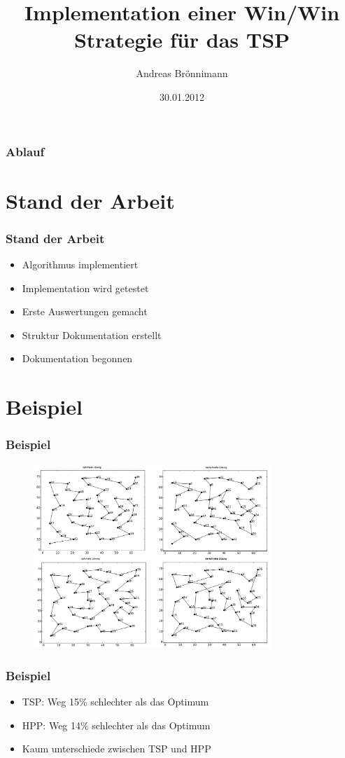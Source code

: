 \documentclass[12pt]{beamer}
\title[Design-Review Semesterarbeit]{Implementation einer Win/Win Strategie für das TSP}
\author{Andreas Brönnimann}
\institute{ZHAW - Zürcher Hochschule für Angewandte Wissenschaften}
\date{30.01.2012}
\begin{document}
    \begin{frame}
        \titlepage
    \end{frame}

    \begin{frame}
        \frametitle{Ablauf}
        \tableofcontents
    \end{frame}

    \section{Stand der Arbeit}
    \begin{frame}
        \frametitle{Stand der Arbeit}
	    \begin{itemize}
                \item Algorithmus implementiert
                \item Implementation wird getestet
                \item Erste Auswertungen gemacht
                \item Struktur Dokumentation erstellt
                \item Dokumentation begonnen
            \end{itemize}
    \end{frame}

    \section{Beispiel}
    \begin{frame}
    \frametitle{Beispiel}
        \begin{figure}[H]
	    \centering
	        \includegraphics[width=9cm]{gfx/eil51_comparison}
        \end{figure}
    \end{frame}

    \begin{frame}
        \frametitle{Beispiel}
	    \begin{itemize}
                \item TSP: Weg 15\% schlechter als das Optimum
                \item HPP: Weg 14\% schlechter als das Optimum
                \item Kaum unterschiede zwischen TSP und HPP
            \end{itemize}
    \end{frame}
\end{document}
